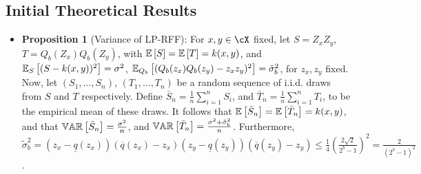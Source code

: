 \documentclass[12pt]{article}
\newcommand{\bS}{\bar{S}}
\newcommand{\bT}{\bar{T}}
\newcommand{\sq}{\sqrt{2}}
\newcommand{\tsigma}{\tilde{\sigma}}
\newcommand{\ulq}{\underline{q}}
\newcommand{\olq}{\overline{q}}
\begin{document}
\subsection{Initial Theoretical Results}
\begin{itemize}
	\item \textbf{Proposition 1} (Variance of LP-RFF):  For $x,y\in\cX$ fixed, let $S=Z_x Z_y$, $T = Q_b(Z_x)Q_b(Z_y)$, with $\expect{}{S}=\expect{}{T} = k(x,y)$, and $\expect{S}{(S-k(x,y))^2} = \sigma^2$, $\expect{Q_b}{(Q_b(z_x)Q_b(z_y)-z_x z_y)^2} = \tsigma_b^2$, for $z_x,z_y$ fixed.  Now, let $(S_1,\ldots,S_n)$, $(T_1,\ldots,T_n)$ be a random sequence of i.i.d. draws from $S$ and $T$ respectively.  Define $\bar{S}_n = \frac{1}{n}\sum_{i=1}^n S_i$, and $\bar{T}_n =  \frac{1}{n}\sum_{i=1}^n T_i$, to be the empirical mean of these draws.  It follows that $\expect{}{\bS_n} = \expect{}{\bT_n} = k(x,y)$, and that
	$\var{}{\bS_n} = \frac{\sigma^2}{n}$, and $\var{}{\bT_n} = \frac{\sigma^2 + \tsigma_b^2}{n}$.
	Furthermore, $\tsigma_b^2 = (z_x-\ulq(z_x))(\olq(z_x)-z_x)(z_y-\ulq(z_y))(\olq(z_y)-z_y) \leq \frac{1}{4}(\frac{2\sq}{2^b-1})^2= \frac{2}{(2^b-1)^2}$.
	

\end{itemize}
\end{document}
